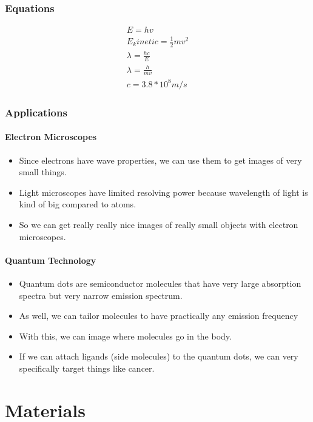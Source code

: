 \documentclass[a4paper,12pt]{report}
\begin{document}
\subsection{Equations}
\begin{eqnarray}
E = hv \\
E_kinetic = \frac{1}{2}mv^2 \\
\lambda = \frac{hc}{E} \\
\lambda = \frac{h}{mv} \\
c = 3.8*10^8 m/s 
\end{eqnarray}

\subsection{Applications}
\subsubsection{Electron Microscopes}
\begin{itemize}
\item Since electrons have wave properties, we can use them to get images of very small things.
\item Light microscopes have limited resolving power because wavelength of light is kind of big compared to atoms.
\item So we can get really really nice images of really small objects with electron microscopes.
\end{itemize} 
\subsubsection{Quantum Technology}
\begin{itemize}
\item Quantum dots are semiconductor molecules that have very large absorption spectra but very narrow emission spectrum.
\item As well, we can tailor molecules to have practically any emission frequency
\item With this, we can image where molecules go in the body.
\item If we can attach ligands (side molecules) to the quantum dots, we can very specifically target things like cancer.
\end{itemize}
\chapter{Materials}
\end{document}

